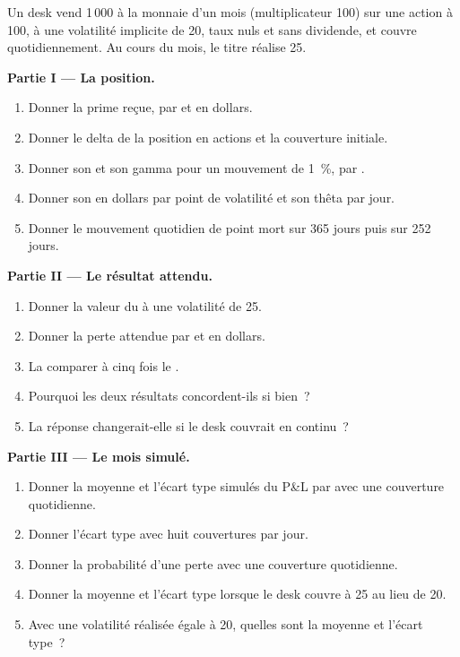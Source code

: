 \begin{problem}\label{pb:dv:greeks-and-the-hedging-pnl:1}
Un desk vend 1\,000  à la monnaie d'un mois (multiplicateur 100) sur une action à
100, à une volatilité implicite de 20, taux nuls et sans dividende, et couvre quotidiennement. Au cours du
mois, le titre réalise 25.

\medskip\noindent\textbf{Partie I --- La position.}
\begin{enumerate}
\item Donner la prime reçue, par  et en dollars.
\item Donner le delta de la position en actions et la couverture initiale.
\item Donner son  et son gamma pour un mouvement de 1~\%, par .
\item Donner son  en dollars par point de volatilité et son thêta par jour.
\item Donner le mouvement quotidien de point mort sur 365 jours puis sur 252 jours.
\end{enumerate}

\medskip\noindent\textbf{Partie II --- Le résultat attendu.}
\begin{enumerate}[resume]
\item Donner la valeur du  à une volatilité de 25.
\item Donner la perte attendue par  et en dollars.
\item La comparer à cinq fois le .
\item Pourquoi les deux résultats concordent-ils si bien~?
\item La réponse changerait-elle si le desk couvrait en continu~?
\end{enumerate}

\medskip\noindent\textbf{Partie III --- Le mois simulé.}
\begin{enumerate}[resume]
\item Donner la moyenne et l'écart type simulés du P\&L par  avec une couverture quotidienne.
\item Donner l'écart type avec huit couvertures par jour.
\item Donner la probabilité d'une perte avec une couverture quotidienne.
\item Donner la moyenne et l'écart type lorsque le desk couvre à 25 au lieu de 20.
\item Avec une volatilité réalisée égale à 20, quelles sont la moyenne et l'écart type~?
\end{enumerate}


\end{problem}
